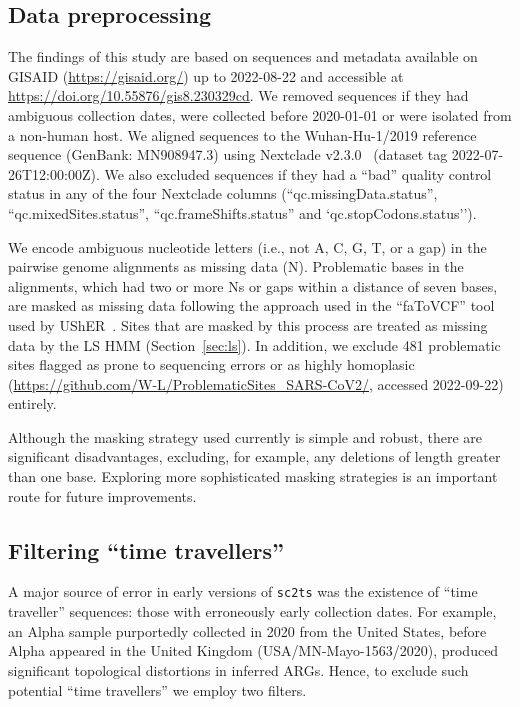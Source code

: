\documentclass{article}
\begin{document}
\subsection{Data preprocessing}
\label{sec:data_preprocessing}
The findings of this study are
based on sequences and metadata available on GISAID (\url{https://gisaid.org/})
up to 2022-08-22 and accessible at
\url{https://doi.org/10.55876/gis8.230329cd}.
We removed sequences
if they had ambiguous collection dates, were collected before 2020-01-01
or were isolated from a non-human host.
We aligned sequences to the Wuhan-Hu-1/2019 reference sequence
(GenBank: MN908947.3) using Nextclade v2.3.0~\citep{Aksamentov2021-hj} (dataset tag
2022-07-26T12:00:00Z). We also excluded sequences if they had a
``bad'' quality control status
in any of the four Nextclade columns (``qc.missingData.status'',
``qc.mixedSites.status'', ``qc.frameShifts.status'' and `qc.stopCodons.status'').

We encode ambiguous nucleotide letters (i.e.,
not A, C, G, T, or a gap) in the pairwise genome alignments as missing data
(N). Problematic bases in the alignments, which had two or more Ns or
gaps within a distance of seven bases, are masked as missing data following
the approach used in the ``faToVCF'' tool used by
UShER~\citep{Turakhia2021-ur}.
Sites that are masked by this process are
treated as missing data by the LS HMM (Section~\ref{sec:ls}).
In addition, we exclude 481 problematic sites flagged as prone to
sequencing errors or as highly homoplasic
(\url{https://github.com/W-L/ProblematicSites_SARS-CoV2/},
accessed 2022-09-22) entirely.

Although the masking strategy used currently is simple and robust,
there are significant disadvantages, excluding, for example, any
deletions of length greater than one base. Exploring more sophisticated
masking strategies is an important route for future improvements.

\subsection{Filtering ``time travellers''}
\label{sec:filtering_time_travellers}
A major source of error in early versions of \texttt{sc2ts} was
the existence of ``time traveller'' sequences: those with erroneously
early collection dates.
For example, an Alpha sample purportedly collected in 2020 from the United States,
before Alpha appeared in the United Kingdom (USA/MN-Mayo-1563/2020),
produced significant topological distortions in
inferred ARGs.
Hence, to exclude such potential ``time travellers'' we employ two filters.
\end{document}
